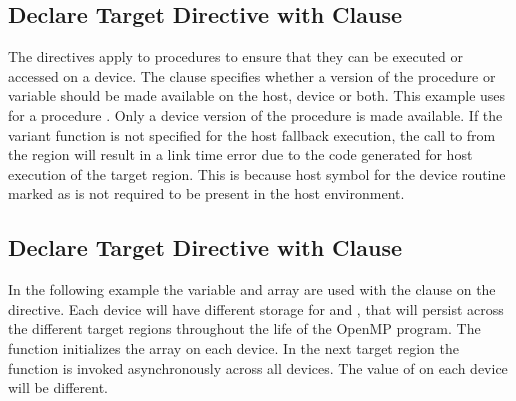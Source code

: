 

\subsection{Declare Target Directive with  Clause}
\label{subsec:declare_target_device_type}




The  directives apply to procedures to ensure that they can be executed or accessed on a device.
The  clause specifies whether a version of the procedure or variable should be made available on the host, device or both. 
This example uses  for a procedure . Only a device version of the procedure  is made available. 
If the variant function  is not specified for the host fallback execution, the call to  from the  region will result in a link time error due to the code generated for host execution of the target region.
This is because host symbol for the device routine  marked as  is not required to be present in the host environment.


\subsection{Declare Target Directive with  Clause}
\label{subsec:declare_target_local}




In the following example the variable  and array  are used with the  clause 
on the  directive. Each device will have different storage for  and
, that will persist across the different target regions throughout the life of the OpenMP program. 
The function  initializes the array on each device. In the next target region the function  is invoked 
asynchronously across all devices. The value of  on each device will be different.

